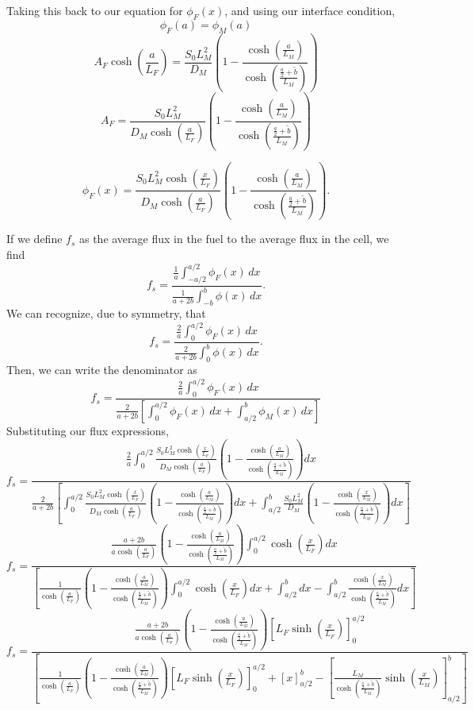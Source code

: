 \documentclass{article}
\begin{document}
Taking this back to our equation for $\phi_F(x)$, and using our interface condition,
$$ \phi_F(a) = \phi_M(a) $$
$$ A_F \cosh\left(\frac{a}{L_F}\right) = \frac{S_0 L_M^2}{D_M}\left( 1 - \frac{\cosh\left(\frac{a}{L_M}\right)}{\cosh\left(\frac{\frac{a}{2}+\tilde{b}}{L_M}\right)}\right) $$
$$ A_F = \frac{S_0 L_M^2}{D_M \cosh\left(\frac{a}{L_F}\right)}\left( 1 - \frac{\cosh\left(\frac{a}{L_M}\right)}{\cosh\left(\frac{\frac{a}{2}+\tilde{b}}{L_M}\right)}\right) $$

$$\boxed{ \phi_F(x) = \frac{S_0 L_M^2 \cosh\left(\frac{x}{L_F}\right)}{D_M \cosh\left(\frac{a}{L_F}\right)}\left( 1 - \frac{\cosh\left(\frac{a}{L_M}\right)}{\cosh\left(\frac{\frac{a}{2}+\tilde{b}}{L_M}\right)}\right) }.$$

If we define $f_s$ as the average flux in the fuel to the average flux in the cell, we find
$$ f_s = \frac{\frac{1}{a}\int_{-a/2}^{a/2} \phi_F(x) \, dx}{\frac{1}{a+2b}\int_{-b}^{b} \phi(x) \, dx} .$$
We can recognize, due to symmetry, that
$$ f_s = \frac{\frac{2}{a}\int_{0}^{a/2} \phi_F(x) \, dx}{\frac{2}{a+2b}\int_{0}^{b} \phi(x) \, dx} .$$
Then, we can write the denominator as
$$ f_s = \frac{\frac{2}{a}\int_{0}^{a/2} \phi_F(x) \, dx}{\frac{2}{a+2b}\left[\int_{0}^{a/2} \phi_F(x) \, dx + \int_{a/2}^{b} \phi_M(x) \, dx \right]} $$
Substituting our flux expressions,
$$ f_s = \frac{\frac{2}{a}\int_{0}^{a/2} \frac{S_0 L_M^2 \cosh\left(\frac{x}{L_F}\right)}{D_M \cosh\left(\frac{a}{L_F}\right)}\left( 1 - \frac{\cosh\left(\frac{a}{L_M}\right)}{\cosh\left(\frac{\frac{a}{2}+\tilde{b}}{L_M}\right)}\right) dx}{\frac{2}{a+2b}\left[\int_{0}^{a/2} \frac{S_0 L_M^2 \cosh\left(\frac{x}{L_F}\right)}{D_M \cosh\left(\frac{a}{L_F}\right)}\left( 1 - \frac{\cosh\left(\frac{a}{L_M}\right)}{\cosh\left(\frac{\frac{a}{2}+\tilde{b}}{L_M}\right)}\right) dx + \int_{a/2}^{b} \frac{S_0 L_M^2}{D_M}\left( 1 - \frac{\cosh\left(\frac{x}{L_M}\right)}{\cosh\left(\frac{\frac{a}{2}+\tilde{b}}{L_M}\right)}\right) dx \right]} $$
$$ f_s = \frac{\frac{a+2b}{a \cosh\left(\frac{a}{L_F}\right)}\left( 1 - \frac{\cosh\left(\frac{a}{L_M}\right)}{\cosh\left(\frac{\frac{a}{2}+\tilde{b}}{L_M}\right)}\right)\int_{0}^{a/2} \cosh\left(\frac{x}{L_F}\right) dx}{\left[\frac{1}{\cosh\left(\frac{a}{L_F}\right)}\left( 1 - \frac{\cosh\left(\frac{a}{L_M}\right)}{\cosh\left(\frac{\frac{a}{2}+\tilde{b}}{L_M}\right)}\right) \int_{0}^{a/2} \cosh\left(\frac{x}{L_F}\right) dx + \int_{a/2}^{b} dx - \int_{a/2}^{b} \frac{\cosh\left(\frac{x}{L_M}\right)}{\cosh\left(\frac{\frac{a}{2}+\tilde{b}}{L_M}\right)} dx \right]} $$
$$ f_s = \frac{\frac{a+2b}{a \cosh\left(\frac{a}{L_F}\right)}\left( 1 - \frac{\cosh\left(\frac{a}{L_M}\right)}{\cosh\left(\frac{\frac{a}{2}+\tilde{b}}{L_M}\right)}\right)\left[L_F\sinh\left(\frac{x}{L_F}\right)\right]_{0}^{a/2}}{\left[\frac{1}{\cosh\left(\frac{a}{L_F}\right)}\left( 1 - \frac{\cosh\left(\frac{a}{L_M}\right)}{\cosh\left(\frac{\frac{a}{2}+\tilde{b}}{L_M}\right)}\right) \left[L_F\sinh\left(\frac{x}{L_F}\right)\right]_{0}^{a/2} + \left[x\right]_{a/2}^{b} - \left[\frac{L_M}{\cosh\left(\frac{\frac{a}{2}+\tilde{b}}{L_M}\right)}\sinh\left(\frac{x}{L_M}\right)\right]_{a/2}^{b} \right]} $$
\end{document}
